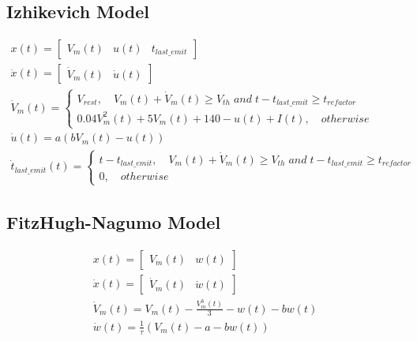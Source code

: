 
\subsection{Izhikevich Model}

\begin{align}
    x(t) = \begin{bmatrix}V_m(t) & u(t) & t_{last\_emit}\end{bmatrix} \label{eq:smm-izhikevich-1} \\
    \dot x(t) = \begin{bmatrix}\dot V_m(t) & \dot u(t)\end{bmatrix} \label{eq:smm-izhikevich-2} \\
    \dot V_m(t) = 
    \begin{cases}
    V_{rest},  \quad V_m(t) + \dot V_m(t) \ge V_{th}\;and\;t-t_{last\_emit}\ge t_{refactor} \\
    0.04V_m^2(t) + 5V_m(t) + 140 - u(t) + I(t), \quad otherwise
    \end{cases}\label{eq:smm-izhikevich-3} \\
    \dot u(t) = a(bV_m(t) - u(t))  \label{eq:smm-izhikevich-4} \\
    \dot t_{last\_emit}(t) = \begin{cases}
        t-t_{last\_emit}, \quad V_m(t) + \dot V_m(t) \ge V_{th}\;and\;t-t_{last\_emit}\ge t_{refactor} \\
        0,\quad otherwise
    \end{cases} \label{eq:smm-izhikevich-5}
\end{align}


\subsection{FitzHugh-Nagumo Model}

\begin{align}
    x(t) = \begin{bmatrix}V_m(t) & w(t)\end{bmatrix} \label{eq:smm-fn-1} \\
    \dot x(t) = \begin{bmatrix}\dot V_m(t) & \dot w(t)\end{bmatrix} \label{eq:smm-fn-2} \\
    \dot V_m(t) = V_m(t) - \frac{V_m^3(t)}{3} - w(t)- bw(t)\label{eq:smm-fn-3} \\
    \dot w(t) = \frac{1}{\tau}(V_m(t) - a -bw(t))\label{eq:smm-fn-3}
\end{align}

